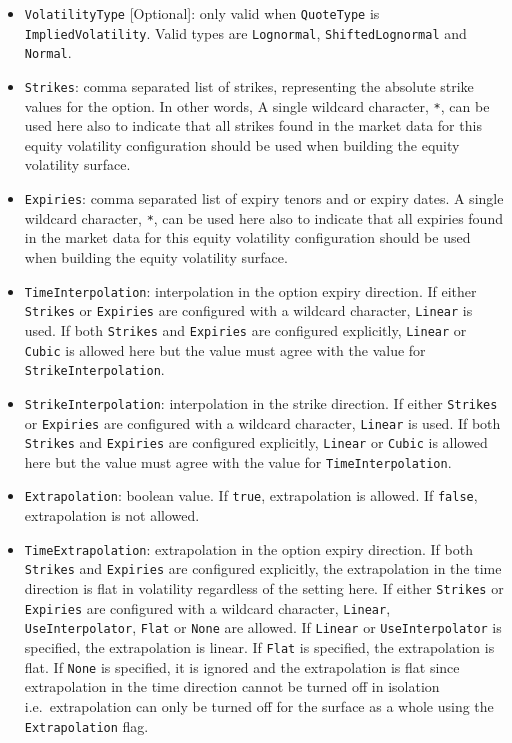 \documentclass[12pt, a4paper]{article}
\begin{document}
{{\begin{itemize}
\item
\lstinline!VolatilityType! [Optional]: only valid when \lstinline!QuoteType! is \lstinline!ImpliedVolatility!. Valid types are \lstinline!Lognormal!, \lstinline!ShiftedLognormal! and \lstinline!Normal!.

\item
\lstinline!Strikes!: comma separated list of strikes, representing the absolute strike values for the option. In other words, A single wildcard character, \lstinline!*!, can be used here also to indicate that all strikes found in the market data for this equity volatility configuration should be used when building the equity volatility surface.

\item
\lstinline!Expiries!: comma separated list of expiry tenors and or expiry dates. A single wildcard character, \lstinline!*!, can be used here also to indicate that all expiries found in the market data for this equity volatility configuration should be used when building the equity volatility surface.

\item
\lstinline!TimeInterpolation!: interpolation in the option expiry direction. If either \lstinline!Strikes! or \lstinline!Expiries! are configured with a wildcard character, \lstinline!Linear! is used. If both \lstinline!Strikes! and \lstinline!Expiries! are configured explicitly, \lstinline!Linear! or \lstinline!Cubic! is allowed here but the value must agree with the value for \lstinline!StrikeInterpolation!.

\item
\lstinline!StrikeInterpolation!: interpolation in the strike direction. If either \lstinline!Strikes! or \lstinline!Expiries! are configured with a wildcard character, \lstinline!Linear! is used. If both \lstinline!Strikes! and \lstinline!Expiries! are configured explicitly, \lstinline!Linear! or \lstinline!Cubic! is allowed here but the value must agree with the value for \lstinline!TimeInterpolation!.

\item
\lstinline!Extrapolation!: boolean value. If \lstinline!true!, extrapolation is allowed. If \lstinline!false!, extrapolation is not allowed.

\item
\lstinline!TimeExtrapolation!: extrapolation in the option expiry direction. If both \lstinline!Strikes! and \lstinline!Expiries! are configured explicitly, the extrapolation in the time direction is flat in volatility regardless of the setting here. If either \lstinline!Strikes! or \lstinline!Expiries! are configured with a wildcard character, \lstinline!Linear!, \lstinline!UseInterpolator!, \lstinline!Flat! or \lstinline!None! are allowed. If \lstinline!Linear! or \lstinline!UseInterpolator! is specified, the extrapolation is linear. If \lstinline!Flat! is specified, the extrapolation is flat. If \lstinline!None! is specified, it is ignored and the extrapolation is flat since extrapolation in the time direction cannot be turned off in isolation i.e.\ extrapolation can only be turned off for the surface as a whole using the \lstinline!Extrapolation! flag.


\end{itemize}}}
\end{document}
